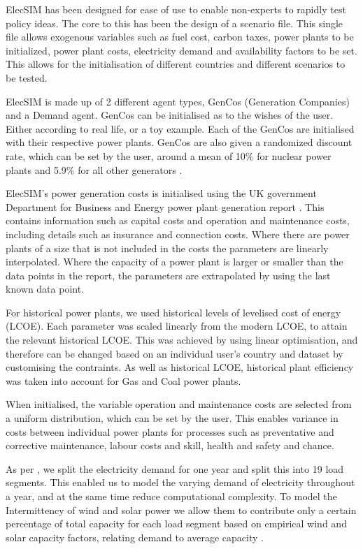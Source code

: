 
ElecSIM has been designed for ease of use to enable non-experts to rapidly test policy ideas. The core to this has been the design of a scenario file. This single file allows exogenous variables such as fuel cost, carbon taxes, power plants to be initialized, power plant costs, electricity demand and availability factors to be set. This allows for the initialisation of different countries and different scenarios to be tested.

ElecSIM is made up of 2 different agent types, GenCos (Generation Companies) and a Demand agent. GenCos can be initialised as to the wishes of the user. Either according to real life, or a toy example. Each of the GenCos are initialised with their respective power plants. GenCos are also given a randomized discount rate, which can be set by the user, around a mean of 10\% for nuclear power plants \cite{Paper2012} and 5.9\% for all other generators \cite{KPMG2017}.

ElecSIM's power generation costs is initialised using the UK government Department for Business and Energy power plant generation report \cite{Department2016}. This contains information such as capital costs and operation and maintenance costs, including details such as insurance and connection costs. Where there are power plants of a size that is not included in the  costs the parameters are linearly interpolated. Where the capacity of a power plant is larger or smaller than the data points in the report, the parameters are extrapolated by using the last known data point.

For historical power plants, we used historical levels of levelised cost of energy (LCOE). Each parameter was scaled linearly from the modern LCOE, to attain the relevant historical LCOE. This was achieved by using linear optimisation, and therefore can be changed based on an individual user's country and dataset by customising the contraints. As well as historical LCOE, historical plant efficiency was taken into account for Gas and Coal power plants.

When initialised, the variable operation and maintenance costs are selected from a uniform distribution, which can be set by the user. This enables variance in costs between individual power plants for processes such as preventative and corrective maintenance, labour costs and skill, health and safety and chance.  

As per \cite{Chappin2017}, we split the electricity demand for one year and split this into 19 load segments. This enabled us to model the varying demand of electricity throughout a year, and at the same time reduce computational complexity. To model the Intermittency of wind and solar power we allow them to contribute only a certain percentage of total capacity for each load segment based on empirical wind and solar capacity factors, relating demand to average capacity \cite{Pfenninger2016, Staffell2016, Chappin2017}.


